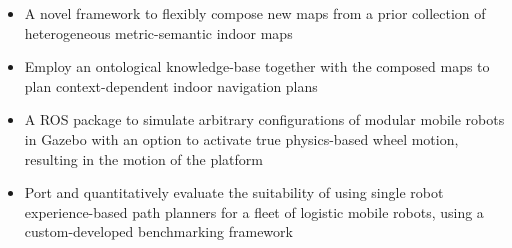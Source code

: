 \documentclass[10pt,a4paper,ragged2e]{altacv}
\begin{document}

\begin{itemize}
    \item A novel framework to flexibly compose new maps from a prior collection of heterogeneous metric-semantic indoor maps
    \item Employ an ontological knowledge-base together with the composed maps to plan context-dependent indoor navigation plans
\end{itemize}


\divider

\begin{itemize}
    \item A ROS package to simulate arbitrary configurations of modular mobile robots in Gazebo with an option to activate true physics-based wheel motion, resulting in the motion of the platform
\end{itemize}

\divider

\begin{itemize}
    \item Port and quantitatively evaluate the suitability of using single robot experience-based path planners for a fleet of logistic mobile robots, using a custom-developed benchmarking framework
\end{itemize}

\end{document}
